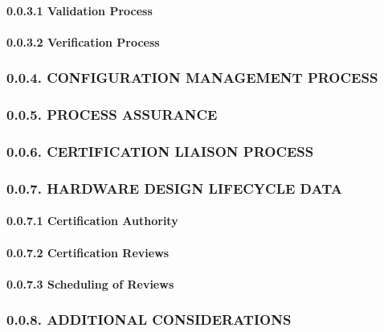 \documentclass[]{article}
\let\oldparagraph\paragraph
\renewcommand{\paragraph}[1]{\oldparagraph{#1}\mbox{}}
\begin{document}
\paragraph{0.0.3.1 Validation Process}\label{validation-process}

\paragraph{0.0.3.2 Verification Process}\label{verification-process}

\subsubsection{0.0.4. CONFIGURATION MANAGEMENT
PROCESS}\label{configuration-management-process}

\subsubsection{0.0.5. PROCESS ASSURANCE}\label{process-assurance}

\subsubsection{0.0.6. CERTIFICATION LIAISON
PROCESS}\label{certification-liaison-process}

\subsubsection{0.0.7. HARDWARE DESIGN LIFECYCLE
DATA}\label{hardware-design-lifecycle-data}

\paragraph{0.0.7.1 Certification
Authority}\label{certification-authority}

\paragraph{0.0.7.2 Certification Reviews}\label{certification-reviews}

\paragraph{0.0.7.3 Scheduling of Reviews}\label{scheduling-of-reviews}

\subsubsection{0.0.8. ADDITIONAL
CONSIDERATIONS}\label{additional-considerations}
\end{document}
